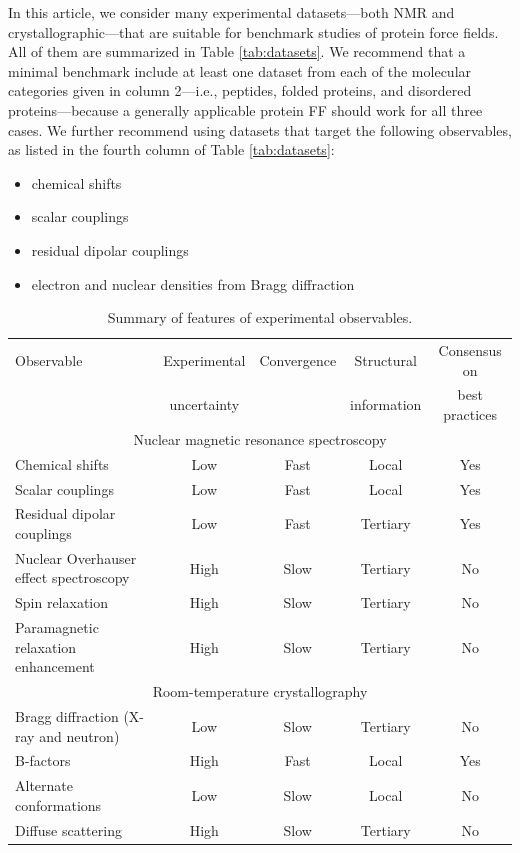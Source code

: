 \documentclass[9pt,review]{livecoms}
\begin{document}
In this article, we consider many experimental datasets---both NMR and crystallographic---that are suitable for benchmark studies of protein force fields.
All of them are summarized in Table \ref{tab:datasets}.
We recommend that a minimal benchmark include at least one dataset from each of the molecular categories given in column 2---i.e., peptides, folded proteins, and disordered proteins---because a generally applicable protein FF should work for all three cases.
We further recommend using datasets that target the following observables, as listed in the fourth column of Table \ref{tab:datasets}:

\begin{itemize}
\item chemical shifts
\item scalar couplings
\item residual dipolar couplings
\item electron and nuclear densities from Bragg diffraction
\end{itemize}

\begin{table}[!ht]
\centering
{}
\begin{tabular}{p{} c c c c}
\toprule
Observable & Experimental & Convergence & Structural & Consensus on \\
& uncertainty & & information & best practices \\
\midrule
\multicolumn{5}{c}{Nuclear magnetic resonance spectroscopy} \\
\midrule
Chemical shifts & Low & Fast & Local & Yes \\
Scalar couplings & Low & Fast & Local & Yes \\
Residual dipolar couplings & Low & Fast & Tertiary & Yes \\
Nuclear Overhauser effect spectroscopy & High & Slow & Tertiary & No \\
Spin relaxation & High & Slow & Tertiary & No \\
Paramagnetic relaxation enhancement & High & Slow & Tertiary & No \\
\midrule
\multicolumn{5}{c}{Room-temperature crystallography} \\
\midrule
Bragg diffraction (X-ray and neutron) & Low & Slow & Tertiary & No \\
B-factors & High & Fast & Local & Yes \\
Alternate conformations & Low & Slow & Local & No \\
Diffuse scattering & High & Slow & Tertiary & No \\
\bottomrule
\end{tabular}
\caption{Summary of features of experimental observables.}
\label{tab:observables}
\end{table}
\end{document}
